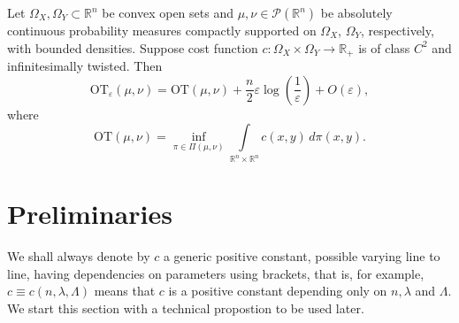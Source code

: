\documentclass[reqno,12pt]{article}
\newcommand{\R}{\mathbb{R}}
\newcommand{\I}{\int\limits}
\begin{document}
\begin{teo}
    \label{thm:CPT}
    Let $\Omega_{X}, \Omega_{Y}\subset \R^{n}$ be convex open sets and $\mu, \nu \in \mathcal{P}(\R^{n})$ be absolutely continuous probability measures compactly supported on $\Omega_{X}$, $\Omega_{Y}$, respectively, with bounded densities. Suppose cost function $c : \Omega_{X}\times \Omega_{Y}\rightarrow \R_{+}$ is of class $C^{2}$ and infinitesimally twisted. Then
    \begin{equation*}
        \mathrm{OT}_{\varepsilon}(\mu,\nu) = \mathrm{OT}(\mu,\nu) + \frac{n}{2}\varepsilon\log\left( \frac{1}{\varepsilon} \right) + O(\varepsilon),
    \end{equation*}
    where 
    \begin{equation*}
        \mathrm{OT}(\mu,\nu) = \inf\limits_{\pi \in \Pi(\mu,\nu)}\I_{\R^{n}\times \R^{n}} c(x,y)\,d\pi(x,y).
    \end{equation*}
\end{teo}




\section{Preliminaries}\label{sec:pre}

We shall always denote by $c$ a generic positive constant, possible varying line to line, having dependencies on parameters using brackets, that is, for example, $c\equiv c(n,\lambda,\Lambda)$ means that $c$ is a positive constant depending only on $n,\lambda$ and $\Lambda$. We start this section with a technical propostion to be used later.
\end{document}
